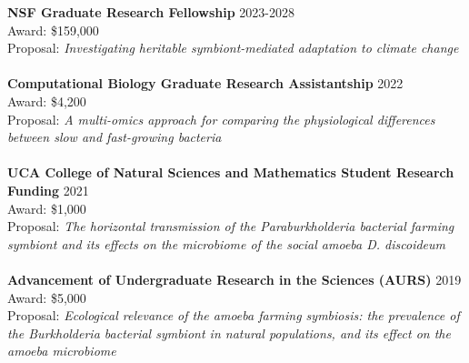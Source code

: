 \documentclass{article}
\begin{document}
\textbf{NSF Graduate Research Fellowship} \hfill 2023-2028\\
Award: \$159,000\\
Proposal: \emph{Investigating heritable symbiont-mediated adaptation to climate change}\\
\\
\textbf{Computational Biology Graduate Research Assistantship} \hfill 2022\\
Award: \$4,200\\
Proposal: \emph{A multi-omics approach for comparing the physiological differences between slow and fast-growing bacteria}\\
\\
\textbf{UCA College of Natural Sciences and Mathematics Student Research Funding} \hfill 2021\\
Award: \$1,000\\
Proposal: \emph{The horizontal transmission of the Paraburkholderia bacterial farming symbiont and its effects on the microbiome of the social amoeba D. discoideum}\\
\\
\textbf{Advancement of Undergraduate Research in the Sciences (AURS)} \hfill 2019\\
Award: \$5,000\\
Proposal: \emph{Ecological relevance of the amoeba farming symbiosis: the prevalence of the Burkholderia bacterial symbiont in natural populations, and its effect on the amoeba microbiome}
\\
\end{document}
